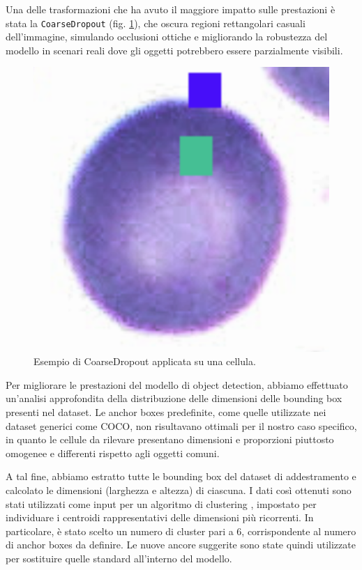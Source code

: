 \documentclass[minted, draw]{../tex/hebdomon}
\newif\ifshowcode
\begin{document}
Una delle trasformazioni che ha avuto il maggiore impatto sulle prestazioni è stata la \texttt{CoarseDropout} (fig. \ref{fig:coarse_dropout_example}), che oscura regioni rettangolari casuali dell’immagine, simulando occlusioni ottiche e migliorando la robustezza del modello in scenari reali dove gli oggetti potrebbero essere parzialmente visibili.

\ifshowcode
\begin{code}{python}
A.CoarseDropout(
    num_holes_range=(3, 6),              # Numero casuale di buchi tra 3 e 6
    hole_height_range=(10, 20),          # Altezza dei buchi tra 10 e 20 px
    hole_width_range=(10, 20),           # Larghezza dei buchi tra 10 e 20 px
    fill="random_uniform",               # Riempie i buchi con valori casuali
    p=0.2                                # Probabilità di applicazione 20%
)
\end{code}
\fi

\begin{figure}[H]
	\centering
	\includegraphics[width=.2\linewidth]{figures/corse_result.png}
	\caption{Esempio di CoarseDropout applicata su una cellula.}
	\label{fig:coarse_dropout_example}
\end{figure}
%



Per migliorare le prestazioni del modello di object detection, abbiamo effettuato un’analisi approfondita della distribuzione delle dimensioni delle bounding box presenti nel dataset. Le anchor boxes predefinite, come quelle utilizzate nei dataset generici come COCO, non risultavano ottimali per il nostro caso specifico, in quanto le cellule da rilevare presentano dimensioni e proporzioni piuttosto omogenee e differenti rispetto agli oggetti comuni.

A tal fine, abbiamo estratto tutte le bounding box del dataset di addestramento e calcolato le dimensioni (larghezza e altezza) di ciascuna. I dati così ottenuti sono stati utilizzati come input per un algoritmo di clustering , impostato per individuare i centroidi rappresentativi delle dimensioni più ricorrenti. In particolare, è stato scelto un numero di cluster pari a 6, corrispondente al numero di anchor boxes da definire. Le nuove ancore suggerite sono state quindi utilizzate per sostituire quelle standard all’interno del modello.
\end{document}
